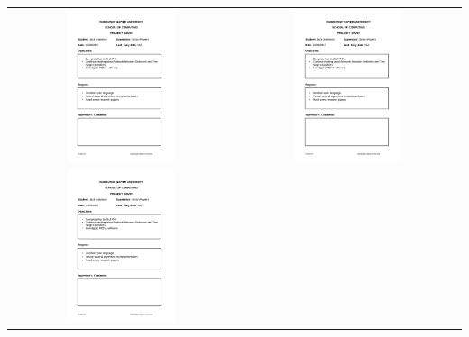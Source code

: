 \documentclass[12pt,a4paper]{article}
\begin{document}
\begin{appendices}
\begin{longtable}{@{}cc@{}}
\includegraphics[page=1, width=0.5\textwidth]{figures/diaries} &
\includegraphics[page=2, width=0.5\textwidth]{figures/diaries} \\
\includegraphics[page=3, width=0.5\textwidth]{figures/diaries} &

\end{longtable}
\end{appendices}
\end{document}

